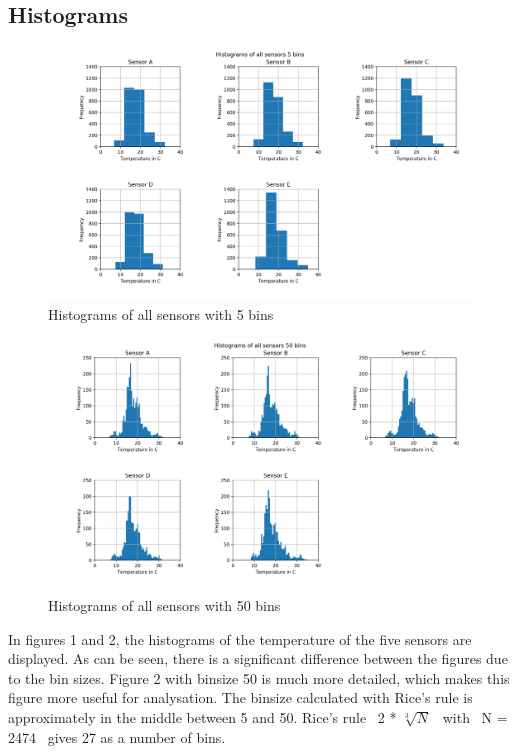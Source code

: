 \documentclass{article}
\begin{document}
    \subsection{Histograms}
        \begin{figure}
            \includegraphics[width=\textwidth]{histogram_5_bins}
            \caption{Histograms of all sensors with 5 bins}
        \end{figure}

        \begin{figure}
            \includegraphics[width=\textwidth]{histogram_50_bins}
            \caption{Histograms of all sensors with 50 bins}
        \end{figure}
        
        In figures 1 and 2, the histograms of the temperature of the five sensors are displayed.
        As can be seen, there is a significant difference between the figures due to the bin sizes.
        Figure 2 with binsize 50 is much more detailed, which makes this figure more useful for analysation.
        The binsize calculated with Rice's rule is approximately in the middle between 5 and 50. 
        Rice's rule \ 2 * $\sqrt[3]{N}$ \ with \ N = 2474 \ gives 27 as a number of bins. 
\end{document}
